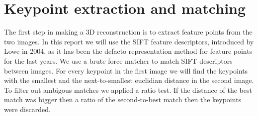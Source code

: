 \section{Keypoint extraction and matching}
\label{matching}
The first step in making a 3D reconstruction is to extract feature points from the two images. 
In this report we will use the SIFT feature descriptors, introduced by Lowe\cite{SIFT} in 2004, as it has been the defacto representation method for feature points for the last years.
We use a brute force matcher to match SIFT descriptors between images. 
For every keypoint in the first image we will find the keypoints with the smallest and the next-to-smallest euclidian distance in the second image. 
To filter out ambigous matches we applied a ratio test. If the distance of the best match was bigger then a ratio of the second-to-best match then the keypoints were discarded. 
